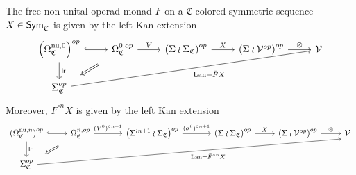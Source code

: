 \documentclass[a4paper,10pt
,draft
]{article}%
\renewcommand{\1}{\eta}%
\begin{document}
\begin{proposition}
      The free non-unital operad monad $\bar F$ on a $\mathfrak C$-colored symmetric sequence $X \in \mathsf{Sym}_{\mathfrak C}$ is given by the left Kan extension
      \[
            \begin{tikzcd}
                  \left(\Omega_{\mathfrak C}^{\text{nu},0}\right)^{op} \arrow[r, hookrightarrow] \arrow[d, "\mathsf{lr}"]
                  &
                  \Omega_{\mathfrak C}^{0,op} \arrow[r,"V"] \arrow[dl, Rightarrow,shorten >=0.4cm,shorten <=0.4cm]
                  &
                  \left(\Sigma \wr \Sigma_{\mathfrak C}\right)^{op} \arrow[r, "X"] 
                  &
                  \left(\Sigma \wr \V^{op}\right)^{op} \arrow[r, "\otimes"]
                  &
                  \V
                  \\
                  \Sigma_{\mathfrak C}^{op} \arrow[urrrr, "\Lan = \bar F X"']
            \end{tikzcd}
      \]
      Moreover, $\bar F^{\circ n}X$ is given by the left Kan extension      
      \begin{equation}
            \label{FREENUOP_EQ}
            \begin{tikzcd}
                  \left(\Omega_{\mathfrak C}^{\text{nu},n}\right)^{op} \arrow[r, hookrightarrow] \arrow[d, "\mathsf{lr}"]
                  &
                  \Omega_{\mathfrak C}^{n,op} \arrow[r,"{(V^0)^{\circ n+1}}"]
                  \arrow[dl, Rightarrow, shorten >=0.4cm,shorten <=0.4cm]
                  &[10pt]
                  \left(\Sigma ^{\wr n+1} \wr \Sigma_{\mathfrak C}\right)^{op} \arrow[r, "{(\sigma^0)^{\circ n+1}}"]
                  &[10pt]
                  \left(\Sigma \wr \Sigma_{\mathfrak C}\right)^{op} \arrow[r, "X"]
                  &
                  \left(\Sigma \wr \V^{op}\right)^{op} \arrow[r, "\otimes"]
                  &
                  \V
                  \\
                  \Sigma_{\mathfrak C}^{op} \arrow[urrrrr, start anchor = east, end anchor = south west, "\Lan = \bar F^{\circ n} X"']
            \end{tikzcd}
      \end{equation}
\end{proposition}
\end{document}
